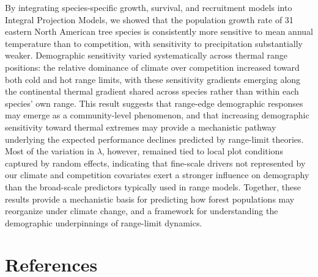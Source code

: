 \documentclass[12pt]{article}
\begin{document}
By integrating species-specific growth, survival, and recruitment models
into Integral Projection Models, we showed that the population growth
rate of 31 eastern North American tree species is consistently more
sensitive to mean annual temperature than to competition, with
sensitivity to precipitation substantially weaker. Demographic
sensitivity varied systematically across thermal range positions: the
relative dominance of climate over competition increased toward both
cold and hot range limits, with these sensitivity gradients emerging
along the continental thermal gradient shared across species rather than
within each species' own range. This result suggests that range-edge
demographic responses may emerge as a community-level phenomenon, and
that increasing demographic sensitivity toward thermal extremes may
provide a mechanistic pathway underlying the expected performance
declines predicted by range-limit theories. Most of the variation in
\(\lambda\), however, remained tied to local plot conditions captured by
random effects, indicating that fine-scale drivers not represented by
our climate and competition covariates exert a stronger influence on
demography than the broad-scale predictors typically used in range
models. Together, these results provide a mechanistic basis for
predicting how forest populations may reorganize under climate change,
and a framework for understanding the demographic underpinnings of
range-limit dynamics.

\hypertarget{references}{%
\section*{References}\label{references}}
\end{document}
